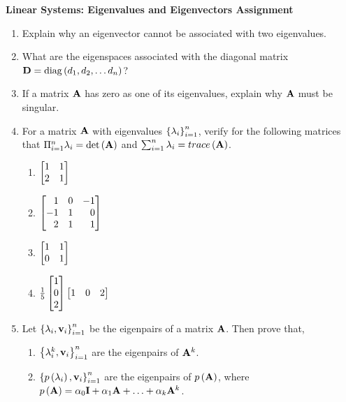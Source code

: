 \documentclass[9pt]{article}
\def\mf{\ensuremath\mathbf}
\def\lp{\ensuremath\left(}
\def\rp{\ensuremath\right)}
\def\lc{\ensuremath\left\{}
\def\rc{\ensuremath\right\}}
\def\bmx{\ensuremath\begin{bmatrix*}[r]}
\def\emx{\ensuremath\end{bmatrix*}}
\begin{document}
\begin{center}
\begin{Large}
\textbf{Linear Systems: Eigenvalues and Eigenvectors Assignment}
\end{Large}
\end{center}
\vspace{0.2cm}

\begin{multicols}{2}

\begin{enumerate}[resume]
    \item Explain why an eigenvector cannot be associated with two eigenvalues.

    \item What are the eigenspaces associated with the diagonal matrix $\mf{D} = \mathrm{diag}\lp d_1, d_2, \ldots d_n\rp$?

    \item If a matrix $\mf{A}$ has zero as one of its eigenvalues, explain why $\mf{A}$ must be singular.

    \item For a matrix $\mf{A}$ with eigenvalues $\lc\lambda_i\rc_{i=1}^{n}$, verify for the following matrices that $\Pi_{i=1}^n\lambda_i = \det \lp\mf{A}\rp$ and $\sum_{i=1}^n \lambda_i = trace\lp\mf{A}\rp$.
    \begin{enumerate}
        \item $\bmx 1 & 1 \\ 2 & 1\emx$
        \item $\bmx 1 & 0 & -1 \\ -1 & 1 & 0 \\ 2 & 1 & 1\emx$
        \item $\bmx 1 & 1 \\ 0 & 1\emx$
        \item $\frac{1}{5}\bmx 1 \\ 0 \\ 2 \emx \bmx 1 & 0 & 2\emx$
    \end{enumerate}

    \item Let $\lc\lambda_i, \mf{v}_i\rc_{i=1}^n$ be the eigenpairs of a matrix $\mf{A}$. Then prove that,
    \begin{enumerate}
        \item $\lc\lambda_i^k, \mf{v}_i\rc_{i=1}^n$ are the eigenpairs of $\mf{A}^k$. 
        \item $\lc p\lp\lambda_i\rp, \mf{v}_i\rc_{i=1}^n$ are the eigenpairs of $p\lp\mf{A}\rp$, where $p\lp \mf{A}\rp = \alpha_0\mf{I} + \alpha_1\mf{A} + \ldots + \alpha_k\mf{A}^k$.
    \end{enumerate}


\end{enumerate}
\end{multicols}
\end{document}

